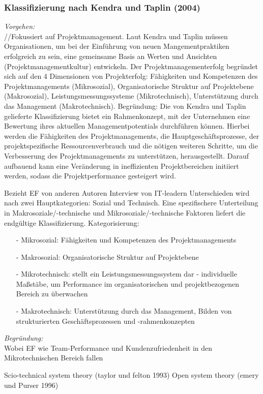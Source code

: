 \noindent
\subsubsection{Klassifizierung nach Kendra und Taplin (2004)}
\textit{Vorgehen:}\\\noindent
//Fokussiert auf Projektmamagement. Laut Kendra und Taplin müssen Organisationen, um bei der Einführung von neuen Mangementpraktiken erfolgreich zu sein, eine gemeinsame Basis an Werten und Ansichten (Projektmanagementkultur) entwickeln. Der Projektmanagementerfolg begründet sich auf den 4 Dimensionen von Projekterfolg: Fähigkeiten und Kompetenzen  des Projektmanagements (Mikrosozial), Organisatorische Struktur auf Projektebene (Makrosozial), Leistungsmessungssysteme (Mikrotechnisch), Unterstützung durch das Management (Makrotechnisch).
Begründung:
Die von Kendra und Taplin gelieferte Klassifizierung bietet ein Rahmenkonzept, mit der Unternehmen eine Bewertung ihres aktuellen Managementpotentials durchführen können. Hierbei werden die Fähigkeiten des Projektmanagements, die Hauptgeschäftsprozesse, der projektspezifische Ressourcenverbrauch und die nötigen weiteren Schritte, um die Verbesserung des Projektmanagements  zu unterstützen, herausgestellt. Darauf aufbauend kann eine Veränderung in ineffizienten Projektbereichen initiiert werden, sodass die Projektperformance gesteigert wird.

Bezieht EF von anderen Autoren
Interview von IT-leadern 
Unterschieden wird nach zwei Hauptkategorien: Sozial und Technisch. Eine spezifischere Unterteilung in Makrosoziale/-technische und Mikrosoziale/-technische Faktoren liefert die endgültige Klassifizierung.
Kategorisierung:
\begin{itemize}
\item[-]Mikrosozial: Fähigkeiten und Kompetenzen  des Projektmanagements 
\item[-]Makrosozial: Organisatorische Struktur auf Projektebene
\item[-]Mikrotechnisch: stellt ein Leistungsmessungssystem dar - individuelle Maßstäbe, um Performance im organisatorischen und projektbezogenen Bereich zu überwachen
\item[-]Makrotechnisch: Unterstützung durch das Management, Bilden von strukturierten Geschäftsprozessen und -rahmenkonzepten 
\end{itemize}
\textit{Begründung:}\\\noindent
Wobei EF wie Team-Performance und Kundenzufriedenheit in den Mikrotechnischen Bereich fallen

Scio-technical system theory (taylor und felton 1993)
Open system theory (emery und Purser 1996)
